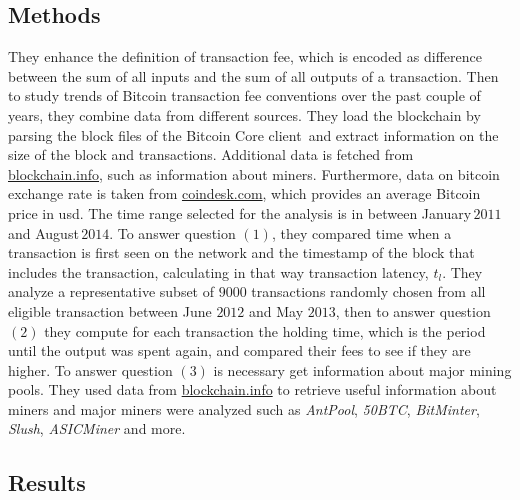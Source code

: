 \documentclass[USenglish]{uit-thesis}
\begin{document}
\subsection{Methods}
They enhance the definition of transaction fee, which is encoded
as difference between the sum of all inputs and the sum of all outputs
of a transaction. Then to study trends of Bitcoin transaction fee
conventions over the past couple of years, they combine data from
different sources. They load the blockchain by parsing
the block files of the Bitcoin Core client\,\cite{bitcoincore}
and extract information on the size of the block and transactions.
Additional data is fetched from \url{blockchain.info}, such as
information about miners. Furthermore, data on bitcoin exchange rate
is taken from \url{coindesk.com}, which provides an average Bitcoin
price in \gls{usd}. The time range selected for the analysis
is in between January\,$2011$ and August\,$2014$. To answer
question $(1)$, they compared time when a transaction is first
seen on the network and the timestamp of the block that includes
the transaction, calculating in that way transaction latency, $t_l$.
They analyze a representative subset of $9000$ transactions
randomly chosen from all eligible transaction between June
$2012$ and May $2013$, then to answer question $(2)$ they
compute for each transaction the holding time, which is the period
until the output was spent again, and compared their fees to see if
they are higher. To answer question $(3)$ is necessary get
information about major mining pools. They used data
from \url{blockchain.info} to retrieve useful information about miners
and major miners were analyzed such as \emph{AntPool}, \emph{50BTC},
\emph{BitMinter}, \emph{Slush}, \emph{ASICMiner} and more.
\subsection{Results}
\end{document}
